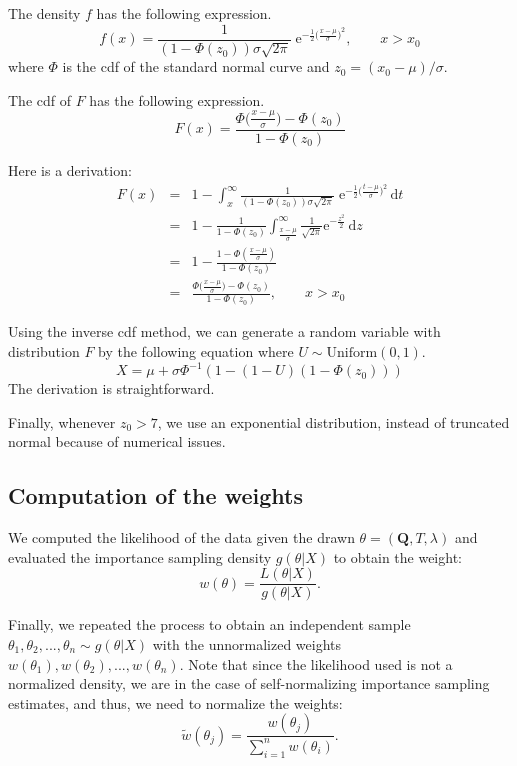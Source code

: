 \documentclass[useAMS,usenatbib]{biom}
\begin{document}
The density $f$ has the following expression.
$$
f(x) = \frac{1}{(1 - \Phi(z_0))\sigma\sqrt{2\pi}}\;
\mathrm{e}^{-\frac{1}{2}\big(\frac{x-\mu}{\sigma}\big)^2}, \qquad x >
x_0
$$
where $\Phi$ is the cdf of the standard normal curve and $z_0 = (x_0-\mu)/\sigma$.

The cdf of $F$ has the following expression.
$$
F(x) =
\frac{\Phi\big(\frac{x-\mu}{\sigma}\big)-\Phi(z_0)}{1-\Phi(z_0)}
$$

Here is a derivation:
\begin{eqnarray*}
F(x) & = & 1 - \int_x^\infty \frac{1}{(1 - \Phi(z_0))\sigma\sqrt{2\pi}}\;
\mathrm{e}^{-\frac{1}{2}\big(\frac{t-\mu}{\sigma}\big)^2} \,\mathrm{d}t \\
& = & 1 - \frac{1}{1 - \Phi(z_0)}
\int_{\frac{x-\mu}{\sigma}}^\infty \frac{1}{\sqrt{2\pi}}
\mathrm{e}^{-\frac{z^2}{2}}\, \mathrm{d}z \\
& = & 1 - \frac{1 - \Phi(\frac{x-\mu}{\sigma})}{1 - \Phi(z_0)} \\
& = & \frac{\Phi\big(\frac{x-\mu}{\sigma}\big)-\Phi(z_0)}{1-\Phi(z_0)}, \qquad x > x_0
\end{eqnarray*}

Using the inverse cdf method, we can generate a random variable with distribution $F$
by the following equation where $U \sim \text{Uniform}(0,1)$.
$$
X = \mu + \sigma \Phi^{-1}( 1 - (1-U)(1-\Phi(z_0)))
$$
The derivation is straightforward.

Finally, whenever $z_0>7$, we use an exponential distribution, instead
of truncated normal because of numerical issues.

\subsection{Computation of the weights}
We computed the likelihood of the data given the drawn $\theta = (\mathbf{Q}, T,
\lambda)$ and evaluated the importance sampling density $g(\theta|X)$
to obtain the weight:
\begin{equation}
w(\theta) = \frac{L(\theta|X)}{g(\theta|X)}.
\end{equation}

Finally, we repeated the process to obtain an independent sample
$\theta_1, \theta_2,...,\theta_n \sim g(\theta|X)$ with the
unnormalized weights $w(\theta_1), w(\theta_2),...,w(\theta_n)$. Note
that since the likelihood used is not a normalized density, we are in
the case of self-normalizing importance sampling estimates, and thus,
we need to normalize the weights:
\begin{equation}
\tilde{w}(\theta_j) = \frac{w(\theta_j)}{\sum_{i=1}^n w(\theta_i)}.
\end{equation}
\end{document}
